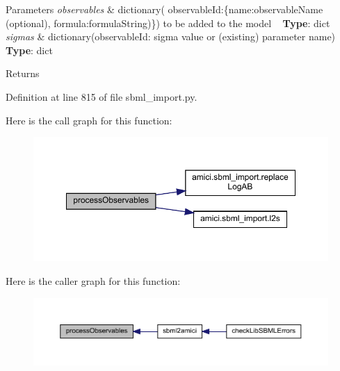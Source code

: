 \begin{DoxyParams}{Parameters}
{\em observables} & dictionary( observable\+Id\+:\{\textquotesingle{}name\textquotesingle{}\+:observable\+Name (optional), \textquotesingle{}formula\textquotesingle{}\+:formula\+String)\}) to be added to the model ~\newline
{\bfseries Type}\+: dict\\
\hline
{\em sigmas} & dictionary(observable\+Id\+: sigma value or (existing) parameter name) ~\newline
{\bfseries Type}\+: dict\\
\hline
\end{DoxyParams}
\begin{DoxyReturn}{Returns}

\end{DoxyReturn}


Definition at line 815 of file sbml\+\_\+import.\+py.

Here is the call graph for this function\+:
\nopagebreak
\begin{figure}[H]
\begin{center}
\leavevmode
\includegraphics[width=350pt]{classamici_1_1sbml__import_1_1_sbml_importer_a903b87aa6c483832424fa2cc76adc4d5_cgraph}
\end{center}
\end{figure}
Here is the caller graph for this function\+:
\nopagebreak
\begin{figure}[H]
\begin{center}
\leavevmode
\includegraphics[width=350pt]{classamici_1_1sbml__import_1_1_sbml_importer_a903b87aa6c483832424fa2cc76adc4d5_icgraph}
\end{center}
\end{figure}
\mbox{\label{classamici_1_1sbml__import_1_1_sbml_importer_a1579faf8b188de11ed58ddbebc3c20a7}} 
